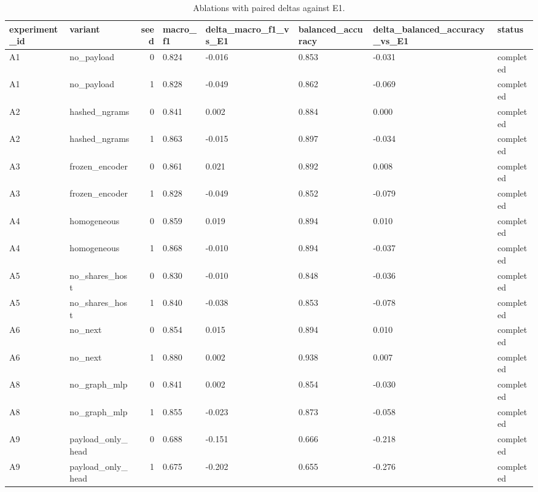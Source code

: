 \begin{table}[htbp]
\centering
\caption{Ablations with paired deltas against E1.}
\label{Tab_R_Ablation}
\footnotesize
\begin{tabular}{llrlllll}
\toprule
experiment\_id & variant & seed & macro\_f1 & delta\_macro\_f1\_vs\_E1 & balanced\_accuracy & delta\_balanced\_accuracy\_vs\_E1 & status \\
\midrule
A1 & no\_payload & 0 & 0.824 & -0.016 & 0.853 & -0.031 & completed \\
A1 & no\_payload & 1 & 0.828 & -0.049 & 0.862 & -0.069 & completed \\
A2 & hashed\_ngrams & 0 & 0.841 & 0.002 & 0.884 & 0.000 & completed \\
A2 & hashed\_ngrams & 1 & 0.863 & -0.015 & 0.897 & -0.034 & completed \\
A3 & frozen\_encoder & 0 & 0.861 & 0.021 & 0.892 & 0.008 & completed \\
A3 & frozen\_encoder & 1 & 0.828 & -0.049 & 0.852 & -0.079 & completed \\
A4 & homogeneous & 0 & 0.859 & 0.019 & 0.894 & 0.010 & completed \\
A4 & homogeneous & 1 & 0.868 & -0.010 & 0.894 & -0.037 & completed \\
A5 & no\_shares\_host & 0 & 0.830 & -0.010 & 0.848 & -0.036 & completed \\
A5 & no\_shares\_host & 1 & 0.840 & -0.038 & 0.853 & -0.078 & completed \\
A6 & no\_next & 0 & 0.854 & 0.015 & 0.894 & 0.010 & completed \\
A6 & no\_next & 1 & 0.880 & 0.002 & 0.938 & 0.007 & completed \\
A8 & no\_graph\_mlp & 0 & 0.841 & 0.002 & 0.854 & -0.030 & completed \\
A8 & no\_graph\_mlp & 1 & 0.855 & -0.023 & 0.873 & -0.058 & completed \\
A9 & payload\_only\_head & 0 & 0.688 & -0.151 & 0.666 & -0.218 & completed \\
A9 & payload\_only\_head & 1 & 0.675 & -0.202 & 0.655 & -0.276 & completed \\
\bottomrule
\end{tabular}
\end{table}
